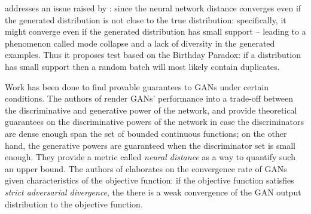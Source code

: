\documentclass[11pt]{hw-template}
\begin{document}
\cite{arora2018do} addresses an issue raised by \cite{arora2017generalization}: since the neural network distance converges even
if the generated distribution is not close to the true distribution: specifically, it might converge even if the generated
distribution has small support -- leading to a phenomenon called mode collapse and a lack of diversity in the generated
examples. Thus it proposes test based on the Birthday Paradox: if a distribution has small support then a random
batch will most likely contain duplicates.

Work has been done to find provable guarantees to GANs under certain conditions. The authors of \cite{zhang2018on} render GANs' performance into a trade-off between the discriminative and generative power of the network, and provide theoretical guarantees on the discriminative powers of the network in case the discriminators are dense enough span the set of bounded continuous functions; on the other hand, the generative powers are guaranteed when the discriminator set is small enough. They provide a metric called \textit{neural distance} as a way to quantify such an upper bound. The authors of \cite{liu2017approximation} elaborates on the convergence rate of GANs given characteristics of the objective function: if the objective function satisfies \textit{strict adversarial divergence}, the there is a weak convergence of the GAN output distribution to the objective function.



\end{document}
